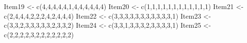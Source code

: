 \documentclass[
  english,
]{book}
\newenvironment{Shaded}{\begin{snugshade}}{\end{snugshade}}
\newcommand{\DecValTok}[1]{\textcolor[rgb]{0.00,0.00,0.81}{#1}}
\newcommand{\FunctionTok}[1]{\textcolor[rgb]{0.00,0.00,0.00}{#1}}
\newcommand{\NormalTok}[1]{#1}
\newcommand{\OtherTok}[1]{\textcolor[rgb]{0.56,0.35,0.01}{#1}}
\begin{document}
\begin{Shaded}
\begin{Highlighting}[]
\NormalTok{Item19 }\OtherTok{\textless{}{-}} \FunctionTok{c}\NormalTok{(}\DecValTok{4}\NormalTok{,}\DecValTok{4}\NormalTok{,}\DecValTok{4}\NormalTok{,}\DecValTok{4}\NormalTok{,}\DecValTok{4}\NormalTok{,}\DecValTok{1}\NormalTok{,}\DecValTok{4}\NormalTok{,}\DecValTok{4}\NormalTok{,}\DecValTok{4}\NormalTok{,}\DecValTok{4}\NormalTok{,}\DecValTok{4}\NormalTok{,}\DecValTok{4}\NormalTok{)}
\NormalTok{Item20 }\OtherTok{\textless{}{-}} \FunctionTok{c}\NormalTok{(}\DecValTok{1}\NormalTok{,}\DecValTok{1}\NormalTok{,}\DecValTok{1}\NormalTok{,}\DecValTok{1}\NormalTok{,}\DecValTok{1}\NormalTok{,}\DecValTok{1}\NormalTok{,}\DecValTok{1}\NormalTok{,}\DecValTok{1}\NormalTok{,}\DecValTok{1}\NormalTok{,}\DecValTok{1}\NormalTok{,}\DecValTok{1}\NormalTok{,}\DecValTok{1}\NormalTok{)}
\NormalTok{Item21 }\OtherTok{\textless{}{-}} \FunctionTok{c}\NormalTok{(}\DecValTok{2}\NormalTok{,}\DecValTok{4}\NormalTok{,}\DecValTok{4}\NormalTok{,}\DecValTok{4}\NormalTok{,}\DecValTok{2}\NormalTok{,}\DecValTok{2}\NormalTok{,}\DecValTok{2}\NormalTok{,}\DecValTok{4}\NormalTok{,}\DecValTok{2}\NormalTok{,}\DecValTok{4}\NormalTok{,}\DecValTok{4}\NormalTok{,}\DecValTok{4}\NormalTok{)}
\NormalTok{Item22 }\OtherTok{\textless{}{-}} \FunctionTok{c}\NormalTok{(}\DecValTok{3}\NormalTok{,}\DecValTok{3}\NormalTok{,}\DecValTok{3}\NormalTok{,}\DecValTok{3}\NormalTok{,}\DecValTok{3}\NormalTok{,}\DecValTok{3}\NormalTok{,}\DecValTok{3}\NormalTok{,}\DecValTok{3}\NormalTok{,}\DecValTok{3}\NormalTok{,}\DecValTok{3}\NormalTok{,}\DecValTok{3}\NormalTok{,}\DecValTok{1}\NormalTok{)}
\NormalTok{Item23 }\OtherTok{\textless{}{-}} \FunctionTok{c}\NormalTok{(}\DecValTok{3}\NormalTok{,}\DecValTok{3}\NormalTok{,}\DecValTok{2}\NormalTok{,}\DecValTok{3}\NormalTok{,}\DecValTok{3}\NormalTok{,}\DecValTok{3}\NormalTok{,}\DecValTok{3}\NormalTok{,}\DecValTok{3}\NormalTok{,}\DecValTok{2}\NormalTok{,}\DecValTok{3}\NormalTok{,}\DecValTok{3}\NormalTok{,}\DecValTok{2}\NormalTok{)}
\NormalTok{Item24 }\OtherTok{\textless{}{-}} \FunctionTok{c}\NormalTok{(}\DecValTok{3}\NormalTok{,}\DecValTok{3}\NormalTok{,}\DecValTok{1}\NormalTok{,}\DecValTok{3}\NormalTok{,}\DecValTok{3}\NormalTok{,}\DecValTok{3}\NormalTok{,}\DecValTok{2}\NormalTok{,}\DecValTok{3}\NormalTok{,}\DecValTok{3}\NormalTok{,}\DecValTok{3}\NormalTok{,}\DecValTok{3}\NormalTok{,}\DecValTok{1}\NormalTok{)}
\NormalTok{Item25 }\OtherTok{\textless{}{-}} \FunctionTok{c}\NormalTok{(}\DecValTok{2}\NormalTok{,}\DecValTok{2}\NormalTok{,}\DecValTok{2}\NormalTok{,}\DecValTok{2}\NormalTok{,}\DecValTok{3}\NormalTok{,}\DecValTok{2}\NormalTok{,}\DecValTok{2}\NormalTok{,}\DecValTok{2}\NormalTok{,}\DecValTok{2}\NormalTok{,}\DecValTok{2}\NormalTok{,}\DecValTok{2}\NormalTok{,}\DecValTok{2}\NormalTok{)}

\end{Highlighting}
\end{Shaded}
\end{document}

